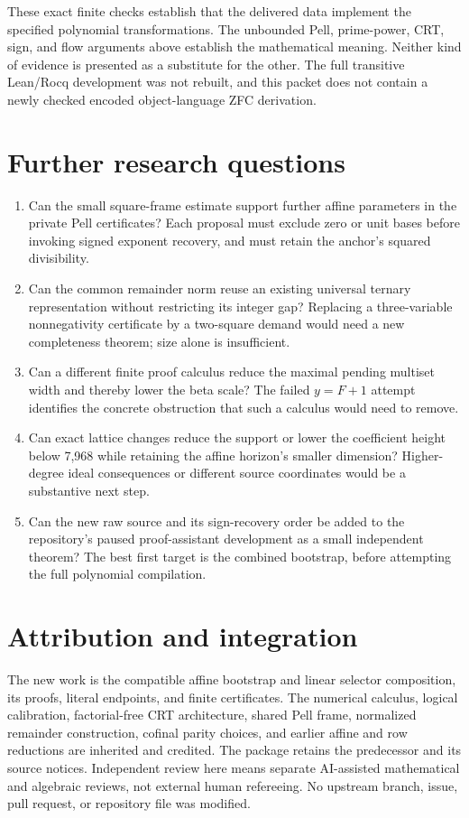 \documentclass[11pt]{article}
\theoremstyle{remark}\newtheorem{remark}[theorem]{Remark}
\begin{document}
These exact finite checks establish that the delivered data implement
the specified polynomial transformations. The unbounded Pell,
prime-power, CRT, sign, and flow arguments above establish the
mathematical meaning. Neither kind of evidence is presented as a
substitute for the other. The full transitive Lean/Rocq development was
not rebuilt, and this packet does not contain a newly checked encoded
object-language ZFC derivation.

\section{Further research questions}

\begin{enumerate}[leftmargin=*]
\item Can the small square-frame estimate support further affine
      parameters in the private Pell certificates? Each proposal must
      exclude zero or unit bases before invoking signed exponent
      recovery, and must retain the anchor's squared divisibility.
\item Can the common remainder norm reuse an existing universal ternary
      representation without restricting its integer gap? Replacing a
      three-variable nonnegativity certificate by a two-square demand
      would need a new completeness theorem; size alone is insufficient.
\item Can a different finite proof calculus reduce the maximal pending
      multiset width and thereby lower the beta scale? The failed
      $y=F+1$ attempt identifies the concrete obstruction that such a
      calculus would need to remove.
\item Can exact lattice changes reduce the support or lower the coefficient
      height below 7,968 while retaining the affine horizon's smaller dimension?
      Higher-degree ideal consequences or
      different source coordinates would be a substantive next step.
\item Can the new raw source and its sign-recovery order be added to the
      repository's paused proof-assistant development as a small
      independent theorem? The best first target is the combined
      bootstrap, before attempting the full polynomial compilation.
\end{enumerate}

\section*{Attribution and integration}
The new work is the compatible affine bootstrap and linear selector
composition, its proofs, literal endpoints, and finite certificates.
The numerical calculus, logical calibration, factorial-free CRT
architecture, shared Pell frame, normalized remainder construction,
cofinal parity choices, and earlier affine and row reductions are
inherited and credited. The package retains the predecessor and its
source notices. Independent review here means separate AI-assisted
mathematical and algebraic reviews, not external human refereeing.
No upstream branch, issue, pull request, or repository file was modified.
\end{document}
